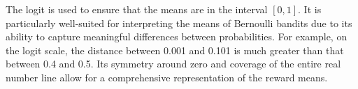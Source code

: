 The logit is used to ensure that the means are in the interval $[0, 1]$.
It is particularly well-suited for interpreting the means of Bernoulli bandits due to its ability to capture meaningful differences between probabilities. For example, on the logit scale, the distance between 0.001 and 0.101 is much greater than that between 0.4 and 0.5.
Its symmetry around zero and coverage of the entire real number line allow for a comprehensive representation of the reward means.

